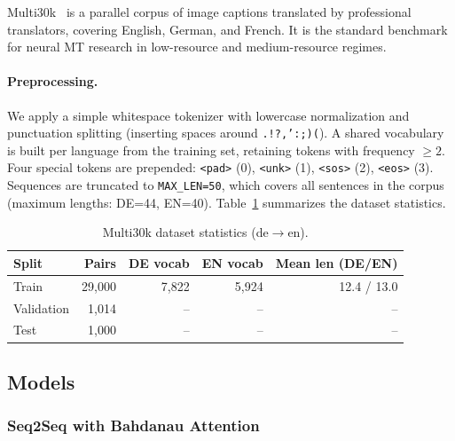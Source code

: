 \documentclass[11pt,a4paper]{article}
\begin{document}
Multi30k~\cite{elliott2016multi30k} is a parallel corpus of image captions
translated by professional translators, covering English, German, and French.
It is the standard benchmark for neural MT research in low-resource and
medium-resource regimes.

\paragraph{Preprocessing.}
We apply a simple whitespace tokenizer with lowercase normalization and
punctuation splitting (inserting spaces around \texttt{.!?,\textquotedbl ':;)(}).
A shared vocabulary is built per language from the training set, retaining
tokens with frequency $\geq 2$. Four special tokens are prepended:
\texttt{<pad>} (0), \texttt{<unk>} (1), \texttt{<sos>} (2), \texttt{<eos>} (3).
Sequences are truncated to \texttt{MAX\_LEN=50}, which covers all sentences
in the corpus (maximum lengths: DE=44, EN=40). Table~\ref{tab:q4-data}
summarizes the dataset statistics.

\begin{table}[H]
\centering
\caption{Multi30k dataset statistics (de$\rightarrow$en).}
\label{tab:q4-data}
\begin{tabular}{lrrrr}
\toprule
\textbf{Split} & \textbf{Pairs} & \textbf{DE vocab} & \textbf{EN vocab}
               & \textbf{Mean len (DE/EN)} \\
\midrule
Train      & 29{,}000 & 7{,}822 & 5{,}924 & 12.4 / 13.0 \\
Validation & 1{,}014  & --      & --      & -- \\
Test       & 1{,}000  & --      & --      & -- \\
\bottomrule
\end{tabular}
\end{table}

\subsection{Models}

\subsubsection{Seq2Seq with Bahdanau Attention}
\end{document}
